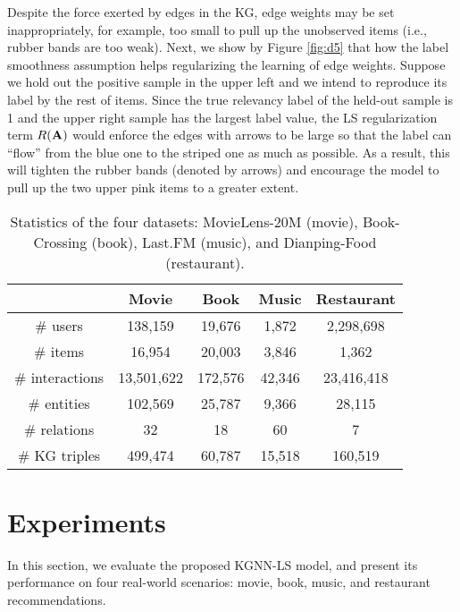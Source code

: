 \documentclass[sigconf]{acmart}
\begin{document}
		Despite the force exerted by edges in the KG, edge weights may be set inappropriately, for example, too small to pull up the unobserved items (i.e., rubber bands are too weak).
		Next, we show by Figure \ref{fig:d5} that how the label smoothness assumption helps regularizing the learning of edge weights.
		Suppose we hold out the positive sample in the upper left and we intend to reproduce its label by the rest of items.
		Since the true relevancy label of the held-out sample is 1 and the upper right sample has the largest label value, the LS regularization term $R({\bf A})$ would enforce the edges with arrows to be large so that the label can ``flow'' from the blue one to the striped one as much as possible.
		As a result, this will tighten the rubber bands (denoted by arrows) and encourage the model to pull up the two upper pink items to a greater extent.
		
	\begin{table}[t]
			\centering
			\begin{tabular}{c|cccc}
				\hline
				& Movie & Book & Music & Restaurant\\
				\hline
				\# users & 138,159 & 19,676 & 1,872 & 2,298,698\\
				\# items & 16,954 & 20,003 & 3,846 & 1,362\\
				\# interactions & 13,501,622 & 172,576 & 42,346 & 23,416,418\\
				\# entities & 102,569 & 25,787 & 9,366 & 28,115\\
				\# relations & 32 & 18 & 60 & 7\\
				\# KG triples & 499,474 & 60,787 & 15,518 & 160,519\\
				\hline
			\end{tabular}
			\vspace{0.05in}
			\caption{Statistics of the four datasets: MovieLens-20M (movie), Book-Crossing (book), Last.FM (music), and Dianping-Food (restaurant).}
			\label{table:statistics}
			\vspace{-0.2in}
		\end{table}

			
\section{Experiments}
	In this section, we evaluate the proposed KGNN-LS model, and present its performance on four real-world scenarios: movie, book, music, and restaurant recommendations.
	
\end{document}
